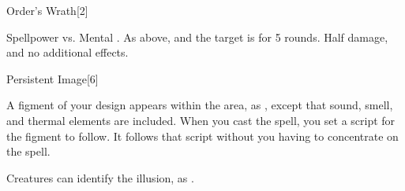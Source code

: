 
\begin{spellsection}{Order's Wrath}[2]
    \begin{spellheader}
    \end{spellheader}
    \begin{spellcontent}
        \begin{spelltargetinginfo}
        \end{spelltargetinginfo}
        \begin{spelleffects}
            \begin{spellattack}{Spellpower vs. Mental}
                \spellsuccess {}.
                \spellcritical As above, and the target is \slowed for 5 rounds.
                \spellfailure Half damage, and no additional effects.
            \end{spellattack}
        \end{spelleffects}
    \end{spellcontent}
    \begin{spellfooter}
        \miscastrandom
    \end{spellfooter}
\end{spellsection}

\begin{spellsection}{Persistent Image}[6]
    \begin{spellheader}
    \end{spellheader}
    \begin{spellcontent}
        \begin{spelltargetinginfo}
        \end{spelltargetinginfo}
        \begin{spelleffects}
            \spelleffect A figment of your design appears within the area, as , except that sound, smell, and thermal elements are included. When you cast the spell, you set a script for the figment to follow. It follows that script without you having to concentrate on the spell.
            \spelldur \durmed \dismissable
        \end{spelleffects}
    \end{spellcontent}
    \begin{spellfooter}
        \spellnotes Creatures can identify the illusion, as .
        \miscastexplode
    \end{spellfooter}
\end{spellsection}

